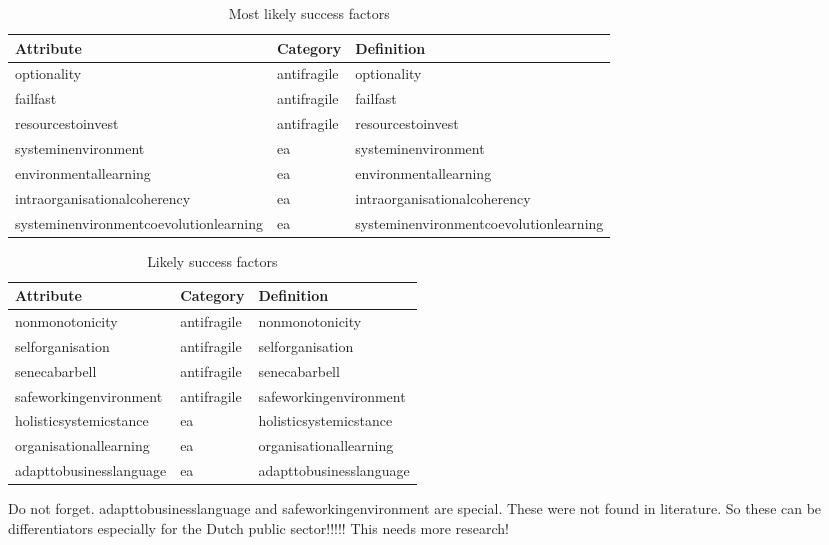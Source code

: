 {\small\tabcolsep=3pt  %
\begin{longtable}{@{}p{}p{}p{}@{}}
	\textbf{Attribute} & \textbf{Category} & \textbf{Definition} \\%
	\midrule%
	\endhead%
	\hline
	\endfoot%
	\caption[Most likely success factors]{Most likely success factors}
	\label{tab:identifiedsuccessfactors}
	\endlastfoot%
	\Gls{optionality} & \Gls{antifragile} & \Glsdesc*{optionality} \\%
	\Gls{failfast} & \Gls{antifragile} & \Glsdesc*{failfast} \\%
	\Gls{resourcestoinvest} & \Gls{antifragile} & \Glsdesc*{resourcestoinvest} \\%
	\Gls{systeminenvironment} & \acrlong{ea} & \Glsdesc*{systeminenvironment} \\%
	\Gls{environmentallearning} & \acrlong{ea} & \Glsdesc*{environmentallearning} \\%
	\Gls{intraorganisationalcoherency} & \acrlong{ea} & \Glsdesc*{intraorganisationalcoherency} \\%
	\Gls{systeminenvironmentcoevolutionlearning} & \acrlong{ea} & \Glsdesc*{systeminenvironmentcoevolutionlearning} \\%
		\bottomrule%
\end{longtable}%
}
{\small\tabcolsep=3pt  %
\begin{longtable}{@{}p{}p{}p{}@{}}
	\textbf{Attribute} & \textbf{Category} & \textbf{Definition} \\%
	\midrule%
	\endhead%
	\hline
	\endfoot%
	\caption[Likely success factors]{Likely success factors}
	\label{tab:identifiedpossiblefactors}
	\endlastfoot%
	\Gls{nonmonotonicity} & \Gls{antifragile} & \Glsdesc*{nonmonotonicity} \\%
	\Gls{selforganisation} & \Gls{antifragile} & \Glsdesc*{selforganisation} \\%
	\Gls{senecabarbell} & \Gls{antifragile} & \Glsdesc*{senecabarbell} \\%
	\Gls{safeworkingenvironment} & \Gls{antifragile} & \Glsdesc*{safeworkingenvironment} \\%
	\Gls{holisticsystemicstance} & \acrlong{ea} & \Glsdesc*{holisticsystemicstance} \\%
	\Gls{organisationallearning} & \acrlong{ea} & \Glsdesc*{organisationallearning} \\%
	\Gls{adapttobusinesslanguage} & \acrlong{ea} & \Glsdesc*{adapttobusinesslanguage} \\%
	\bottomrule%
\end{longtable}%
}
\begin{remark}
	Do not forget. \Gls{adapttobusinesslanguage} and \gls{safeworkingenvironment} are special. These were not found in literature. So these can be differentiators especially for the Dutch public sector!!!!! This needs more research!
\end{remark}




